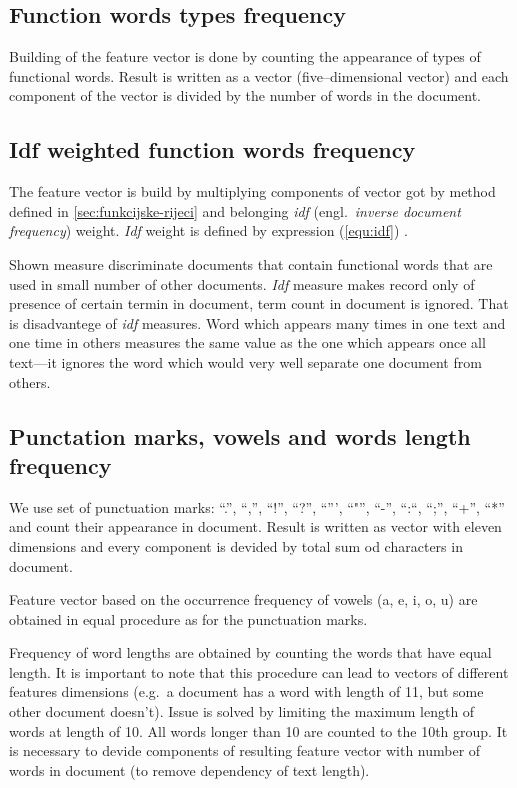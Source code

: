 \documentclass[11pt,english]{article}
\newcommand{\engl}[1]{(engl.~\emph{#1})}
\begin{document}
\begin{multicols}{2}
\subsection{Function words types frequency}
\label{sec:funkcijske-rijeci-grupe}
Building of the feature vector is done by counting the appearance of
types of functional words. Result is written as a vector (five--dimensional
vector) and each component of the vector is divided by the number of words in
the document.


\subsection{Idf weighted function words frequency}
\label{sec:funkcijske-rijeci-idf}
The feature vector is build by multiplying components of vector got by method
defined in \ref{sec:funkcijske-rijeci} and belonging \emph{idf} \engl{inverse
document frequency} weight. \emph{Idf} weight is defined by expression
(\ref{equ:idf}) \citep{diederich2003authorship}.

Shown measure discriminate documents that contain functional words that are
used in small number of other documents. \emph{Idf} measure makes record only
of presence of certain termin in document, term count in document is ignored.
That is disadvantege of \emph{idf} measures. Word which appears many times in one
text and one time in others measures the same value as the one which appears
once all text---it ignores the word which would very well separate one
document from others.

\subsection{Punctation marks, vowels and words length frequency}
\label{sec:znacajke-manje}
We use set of punctuation marks: ``.'', ``,'', ``!'', ``?'', ``''',
``"'', ``-'', ``:``, ``;'', ``+'', ``*'' and count their appearance in document.
Result is written as vector with eleven dimensions and every component is devided
by total sum od characters in document.

Feature vector based on the occurrence frequency of vowels (a, e, i, o, u) are
obtained in equal procedure as for the punctuation marks.

Frequency of word lengths are obtained by counting the words that have equal
length. It is important to note that this procedure can lead to vectors of
different features dimensions (e.g.\ a document has a word with length of 11,
but some other document doesn't). Issue is solved by limiting the maximum length
of words at length of 10. All words longer than 10 are counted to
the 10th group. It is necessary to devide components of resulting feature
vector with number of words in document (to remove dependency of text length).


\end{multicols}
\end{document}
